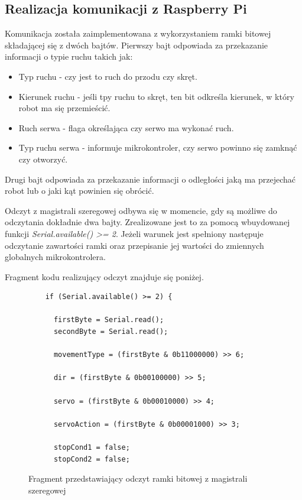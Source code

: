 \subsection{Realizacja komunikacji z Raspberry Pi}

Komunikacja została zaimplementowana z wykorzystaniem ramki bitowej składającej się z dwóch bajtów. Pierwszy bajt odpowiada za przekazanie informacji o typie ruchu takich jak:
\begin{itemize}
  \item Typ ruchu - czy jest to ruch do przodu czy skręt.
  \item Kierunek ruchu - jeśli tpy ruchu to skręt, ten bit odkreśla kierunek, w który robot ma się przemieścić.
  \item Ruch serwa - flaga określająca czy serwo ma wykonać ruch.
  \item Typ ruchu serwa - informuje mikrokontroler, czy serwo powinno się zamknąć czy otworzyć. 
\end{itemize}

Drugi bajt odpowiada za przekazanie informacji o odległości jaką ma przejechać robot lub o jaki kąt powinien się obrócić. 

Odczyt z magistrali szeregowej odbywa się w momencie, gdy są możliwe do odczytania dokładnie dwa bajty. Zrealizowane jest to za pomocą wbuydowanej funkcji \textit{Serial.available() >= 2}. Jeżeli warunek jest spełniony następuje odczytanie zawartości ramki oraz przepisanie jej wartości do zmiennych globalnych mikrokontrolera. 

Fragment kodu realizujący odczyt znajduje się poniżej.

\begin{figure}[H]
  \centering
  \begin{lstlisting}
    if (Serial.available() >= 2) {  
      
      firstByte = Serial.read();
      secondByte = Serial.read();

      movementType = (firstByte & 0b11000000) >> 6;

      dir = (firstByte & 0b00100000) >> 5;

      servo = (firstByte & 0b00010000) >> 4;

      servoAction = (firstByte & 0b00001000) >> 3;

      stopCond1 = false;
      stopCond2 = false;
  \end{lstlisting}
  \caption{Fragment przedstawiający odczyt ramki bitowej z magistrali szeregowej}
  \label{fig:read-uart}
\end{figure}

